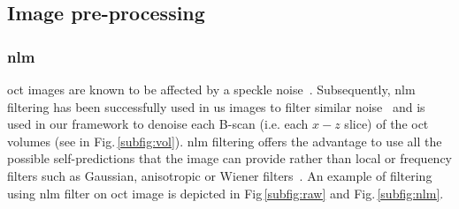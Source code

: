 


\subsection{Image pre-processing}\label{subsec:prepro}


\subsubsection{\acf{nlm}}
\Ac{oct} images are known to be affected by a speckle noise~\cite{schmitt1999speckle}.
Subsequently, \ac{nlm}~\cite{buades2005non} filtering has been successfully used in \ac{us} images to filter similar noise~\cite{Coupe2009} and is used in our framework to denoise each B-scan (i.e. each $x-z$ slice) of the \ac{oct} volumes (see in Fig.\,\ref{subfig:vol}).
\ac{nlm} filtering offers the advantage to use all the possible self-predictions that the image can provide rather than local or frequency filters such as Gaussian, anisotropic or Wiener filters~\cite{buades2005non}.
An example of filtering using \ac{nlm} filter on \ac{oct} image is depicted in Fig\,\ref{subfig:raw} and Fig.\,\ref{subfig:nlm}.

